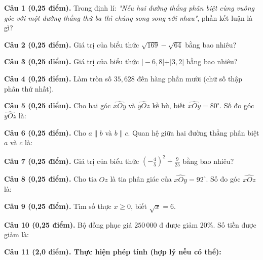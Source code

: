 \documentclass[12pt,a4paper]{article}
\begin{document}
\noindent\textbf{Câu 1 (0,25 điểm).} Trong định lí: \textit{"Nếu hai đường thẳng phân biệt cùng vuông góc với một đường thẳng thứ ba thì chúng song song với nhau"}, phần kết luận là gì? \par\vspace{0.35mm}
\noindent\textbf{Câu 2 (0,25 điểm).} Giá trị của biểu thức $\sqrt{169} - \sqrt{64}$ bằng bao nhiêu? \par\vspace{0.35mm}
\noindent\textbf{Câu 3 (0,25 điểm).} Giá trị của biểu thức $\vert -6{,}8\vert + \vert 3{,}2\vert$ bằng bao nhiêu? \par\vspace{0.35mm}
\noindent\textbf{Câu 4 (0,25 điểm).} Làm tròn số $35{,}628$ đến hàng phần mười (chữ số thập phân thứ nhất). \par\vspace{0.35mm}
\noindent\textbf{Câu 5 (0,25 điểm).} Cho hai góc $\widehat{xOy}$ và $\widehat{yOz}$ kề bù, biết $\widehat{xOy} = 80^\circ$. Số đo góc $\widehat{yOz}$ là: \par\vspace{0.35mm}
\noindent\textbf{Câu 6 (0,25 điểm).} Cho $a \parallel b$ và $b \parallel c$. Quan hệ giữa hai đường thẳng phân biệt $a$ và $c$ là: \par\vspace{0.35mm}
\noindent\textbf{Câu 7 (0,25 điểm).} Giá trị của biểu thức $\left(-\frac{4}{5}\right)^2 + \frac{9}{25}$ bằng bao nhiêu? \par\vspace{0.35mm}
\noindent\textbf{Câu 8 (0,25 điểm).} Cho tia $Oz$ là tia phân giác của $\widehat{xOy} = 92^\circ$. Số đo góc $\widehat{xOz}$ là: \par\vspace{0.35mm}
\noindent\textbf{Câu 9 (0,25 điểm).} Tìm số thực $x \ge 0$, biết $\sqrt{x} = 6$. \par\vspace{0.35mm}
\noindent\textbf{Câu 10 (0,25 điểm).} Bộ đồng phục giá $250\,000$ đ được giảm $20\%$. Số tiền được giảm là: \par\vspace{0.35mm}
\vspace{0.6mm}

\noindent\textbf{Câu 11 (2,0 điểm). Thực hiện phép tính (hợp lý nếu có thể):}
\vspace{0.6mm}
\end{document}
